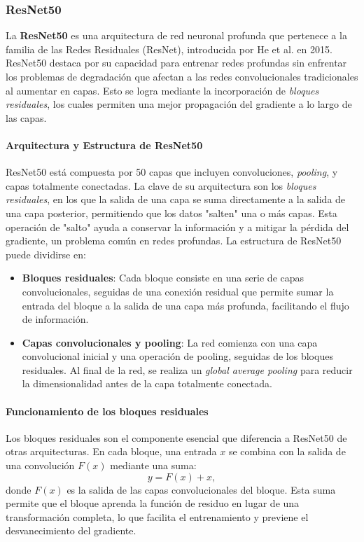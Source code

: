 \subsubsection{ResNet50}

La \textbf{ResNet50} es una arquitectura de red neuronal profunda que pertenece a la familia de las Redes Residuales (ResNet), introducida por He et al. en 2015. ResNet50 destaca por su capacidad para entrenar redes profundas sin enfrentar los problemas de degradación que afectan a las redes convolucionales tradicionales al aumentar en capas. Esto se logra mediante la incorporación de \textit{bloques residuales}, los cuales permiten una mejor propagación del gradiente a lo largo de las capas.

\paragraph{Arquitectura y Estructura de ResNet50}

ResNet50 está compuesta por 50 capas que incluyen convoluciones, \textit{pooling}, y capas totalmente conectadas. La clave de su arquitectura son los \textit{bloques residuales}, en los que la salida de una capa se suma directamente a la salida de una capa posterior, permitiendo que los datos "salten" una o más capas. Esta operación de "salto" ayuda a conservar la información y a mitigar la pérdida del gradiente, un problema común en redes profundas. La estructura de ResNet50 puede dividirse en:
\begin{itemize}
    \item \textbf{Bloques residuales}: Cada bloque consiste en una serie de capas convolucionales, seguidas de una conexión residual que permite sumar la entrada del bloque a la salida de una capa más profunda, facilitando el flujo de información.
    \item \textbf{Capas convolucionales y pooling}: La red comienza con una capa convolucional inicial y una operación de pooling, seguidas de los bloques residuales. Al final de la red, se realiza un \textit{global average pooling} para reducir la dimensionalidad antes de la capa totalmente conectada.
\end{itemize}

\paragraph{Funcionamiento de los bloques residuales}
Los bloques residuales son el componente esencial que diferencia a ResNet50 de otras arquitecturas. En cada bloque, una entrada \( x \) se combina con la salida de una convolución \( F(x) \) mediante una suma: 
\[
y = F(x) + x,
\]
donde \( F(x) \) es la salida de las capas convolucionales del bloque. Esta suma permite que el bloque aprenda la función de residuo en lugar de una transformación completa, lo que facilita el entrenamiento y previene el desvanecimiento del gradiente.

